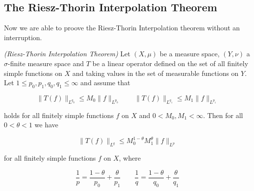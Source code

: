 	\subsection{The Riesz-Thorin Interpolation Theorem}
Now we are able to proove the Riesz-Thorin Interpolation theorem without an interruption.

\vspace{2mm}

\begin{mdframed}
	\begin{theorem}\emph{(Riesz-Thorin Interpolation Theorem)}
		Let $(X,\mu)$ be a measure space, $(Y,\nu)$ a $\sigma$-finite measure space and $T$ be a linear operator defined on the set of all finitely simple functions on $X$ and taking values in the set of measurable functions on $Y$. Let $1 \leqslant p_0,p_1,q_0,q_1 \leqslant \infty$ and assume that

		\begin{equation}
			\|T(f)\|_{L^{q_0}} \leqslant M_0\|f\|_{L^{p_0}} \qquad \|T(f)\|_{L^{q_1}} \leqslant M_1\|f\|_{L^{p_1}}
		\end{equation}

		holds for all finitely simple functions $f$ on $X$ and $0 < M_0,M_1 < \infty$. Then for all $0 < \theta < 1$ we have

		\begin{equation}
			\|T(f)\|_{L^q} \leqslant M_0^{1 - \theta}M_1^\theta\|f\|_{L^p}
		\end{equation}

		for all finitely simple functions $f$ on $X$, where

		\begin{equation}
			\frac{1}{p} = \frac{1 - \theta}{p_0} + \frac{\theta}{p_1} \qquad \frac{1}{q} = \frac{1 - \theta}{q_0} + \frac{\theta}{q_1}
		\end{equation}
	\end{theorem}
\end{mdframed}


